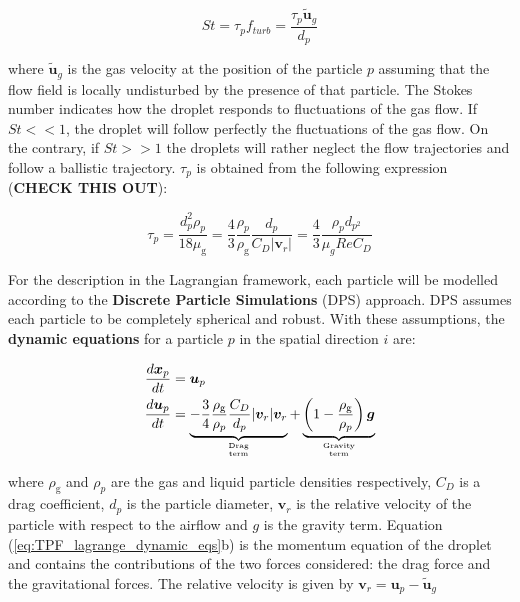 \begin{equation}
St = \tau_p f_{turb} = \frac{\tau_p \widetilde{\boldsymbol{u}}_g}{d_p}
\end{equation}

where $\widetilde{\boldsymbol{u}}_g$ is the gas velocity at the position of the particle $p$ assuming that the flow field is locally undisturbed by the presence of that particle. The Stokes number indicates how the droplet responds to fluctuations of the gas flow. If $St << 1$, the droplet will follow perfectly the fluctuations of the gas flow. On the contrary, if $St >> 1$ the droplets will rather neglect the flow trajectories and follow a ballistic trajectory. $\tau_p$ is obtained from the following expression (\textbf{CHECK THIS OUT}):


\begin{equation}
\tau_p = \frac{d_p^2 \rho_p}{18 \mu_\mathrm{g}} =  \frac{4}{3} \frac{\rho_p}{\rho_\mathrm{g}} \frac{d_p}{C_D | \boldsymbol{v}_r |} = \frac{4}{3} \frac{\rho_p d_{p^2}}{\mu_g Re C_D}
\end{equation}

For the description in the Lagrangian framework, each particle will be modelled according to the \textbf{Discrete Particle Simulations} (DPS) approach. DPS assumes each particle to be completely spherical and robust. With these assumptions, the \textbf{dynamic equations} for a particle $p$ in the spatial direction $i$ are:

\begin{subequations}
\label{eq:TPF_lagrange_dynamic_eqs}
\begin{align}
\frac{d \boldsymbol{x}_p}{d t} &= \boldsymbol{u}_p \\
\frac{d \boldsymbol{u}_p}{d t} &= \underbrace{ - \frac{3}{4} \frac{\rho_\mathrm{g}}{\rho_p} \frac{C_D}{d_p} | \boldsymbol{v}_r | \boldsymbol{v}_r }_{\text{Drag}\atop\text{term}}  + \underbrace{ \left( 1 - \frac{\rho_\mathrm{g}}{\rho_p} \right) \boldsymbol{g} }_{\text{Gravity}\atop\text{term}} 
\end{align}
\end{subequations}


where $\rho_\mathrm{g}$ and $\rho_p$ are the gas and liquid particle densities respectively, $C_D$ is a drag coefficient, $d_p$ is the particle diameter, $\boldsymbol{v}_r$ is the relative velocity of the particle with respect to the airflow and $g$ is the gravity term. Equation (\ref{eq:TPF_lagrange_dynamic_eqs}b) is the momentum equation of the droplet and contains the contributions of the two forces considered: the drag force and the gravitational forces. The relative velocity is given by $\boldsymbol{v}_r = \boldsymbol{u}_p - \widetilde{\boldsymbol{u}}_g$ 

